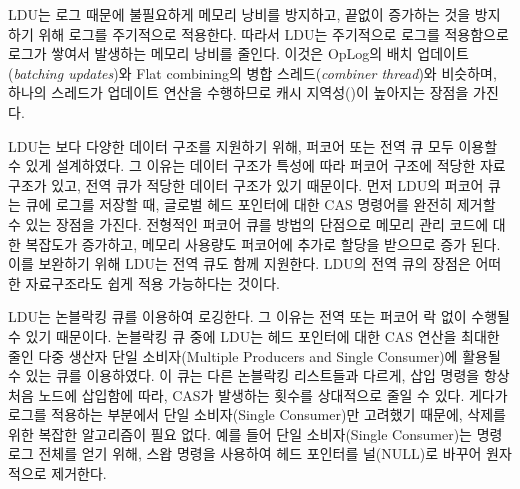 LDU는 로그 때문에 불필요하게 메모리 낭비를 방지하고, 끝없이 증가하는 것을 방지하기 위해 
로그를 주기적으로 적용한다. 
따라서 LDU는 주기적으로 로그를 적용함으로 로그가 쌓여서 발생하는 메모리 낭비를 줄인다. 
이것은 OpLog의 배치 업데이트(\textit{batching updates})와 Flat combining의 병합
스레드(\textit{combiner thread})와 비슷하며, 하나의 스레드가 업데이트 연산을 수행하므로 
캐시 지역성()이 높아지는 장점을 가진다. 

LDU는 보다 다양한 데이터 구조를 지원하기 위해, 퍼코어 또는 전역 큐 모두 이용할 수 있게
설계하였다.
그 이유는 데이터 구조가 특성에 따라 퍼코어 구조에 적당한 자료구조가 있고,
전역 큐가 적당한 데이터 구조가 있기 때문이다.
먼저 LDU의 퍼코어 큐는 큐에 로그를 저장할 때, 글로벌 헤드 포인터에 대한 CAS
명령어를 완전히 제거할 수 있는 장점을 가진다.
전형적인 퍼코어 큐를 방법의 단점으로 메모리 관리 코드에 대한 복잡도가 증가하고, 
메모리 사용량도 퍼코어에 추가로 할당을 받으므로 증가 된다.
이를 보완하기 위해 LDU는 전역 큐도 함께 지원한다.
LDU의 전역 큐의 장점은 어떠한 자료구조라도 쉽게 적용 가능하다는 것이다. 

LDU는 논블락킹 큐를 이용하여 로깅한다. 
그 이유는 전역 또는 퍼코어 락 없이 수행될 수 있기 때문이다. 
논블락킹 큐 중에 LDU는 헤드 포인터에 대한 CAS 연산을 최대한 줄인 다중 생산자 
단일 소비자(Multiple Producers and Single Consumer)에 활용될 수 있는 큐를 이용하였다.
이 큐는 다른 논블락킹 리스트들과 다르게, 삽입 명령을 항상 처음 노드에 삽입함에
따라, CAS가 발생하는 횟수를 상대적으로 줄일 수 있다.
게다가 로그를 적용하는 부분에서 단일 소비자(Single Consumer)만 고려했기 때문에, 
삭제를 위한 복잡한 알고리즘이 필요 없다. 
예를 들어 단일 소비자(Single Consumer)는 명령 로그 전체를 얻기 위해, 스왑 명령을 사용하여 
헤드 포인터를 널(NULL)로 바꾸어 원자적으로 제거한다.

